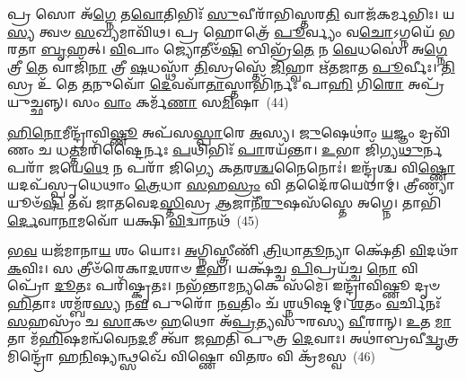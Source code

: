 {\anuvakamend[{\-\ul{𑌰}\-\-\ul{𑌕𑍍𑌷}\-\-\ul{𑌸𑍍𑌵} 𑌭𑍍𑌰𑌾𑌤𑍃᳴\-\ul{𑌵𑍍𑌯}\-𑌸𑍍𑌤𑍍𑌰𑌯𑍋᳴𑌦𑌶 𑌚}]}%

𑌪𑍍𑌰 𑌸𑍋 𑌅᳴\-\ul{𑌗𑍍𑌨𑍇} 𑌤\-\ul{𑌵𑍋}\-𑌤𑌿𑌭𑌿𑌃᳴ \ul{𑌸𑍁}\-𑌵𑍀𑌰𑌾᳴𑌭𑌿𑌸𑍍𑌤𑌰\-\ul{𑌤𑌿} 𑌵𑌾𑌜᳴𑌕𑌰𑍍𑌮𑌭𑌿𑌃। 𑌯\-\ul{𑌸𑍍𑌯} 𑌤𑍍𑌵𑍞 \ul{𑌸}\-𑌖𑍍𑌯𑌮𑌾𑌵𑌿᳴𑌥। 𑌪𑍍𑌰 𑌹𑍋𑌤𑍍𑌰𑍇᳴ \ul{𑌪𑍂}\-𑌰𑍍𑌵𑍍𑌯𑌂 𑌵\-\ul{𑌚𑍋}\-\-𑌽𑌗𑍍𑌨𑌯𑍇᳴ 𑌭𑌰𑌤𑌾 \ul{𑌬𑍃}\-𑌹𑌤𑍍। \ul{𑌵𑌿}\-𑌪𑌾𑌂 𑌜𑍍𑌯𑍋𑌤𑍀𑍞᳴\-\ul{𑌷𑌿} 𑌬𑌿𑌭𑍍𑌰᳴\-\ul{𑌤𑍇} 𑌨 \ul{𑌵𑍇}\-𑌧𑌸𑍇॑। 𑌅\-\ul{𑌗𑍍𑌨𑍇} 𑌤𑍍𑌰𑍀 \ul{𑌤𑍇} 𑌵𑌾𑌜𑌿᳴\-\ul{𑌨𑌾} 𑌤𑍍𑌰𑍀 \ul{𑌷}\-𑌧𑌸𑍍𑌥𑌾᳴ \ul{𑌤𑌿}\-𑌸𑍍𑌰𑌸𑍍𑌤𑍇᳴ \ul{𑌜𑌿}\-𑌹𑍍𑌵𑌾 𑌋᳴𑌤𑌜𑌾𑌤 \ul{𑌪𑍂}\-𑌰𑍍𑌵𑍀𑌃। \ul{𑌤𑌿}\-𑌸𑍍𑌰 𑌉᳴ 𑌤𑍇 \ul{𑌤}\-𑌨𑍁𑌵𑍋᳴ \ul{𑌦𑍇}\-𑌵𑌵𑌾᳴\-\ul{𑌤𑌾}\-𑌸𑍍𑌤𑌾𑌭𑌿᳴𑌰𑍍𑌨𑌃 𑌪𑌾\-\ul{𑌹𑌿} 𑌗𑌿\-\ul{𑌰𑍋} 𑌅𑌪𑍍𑌰᳴𑌯𑍁𑌚𑍍𑌛𑌨𑍍𑌨𑍍। 𑌸𑌂 \ul{𑌵𑌾𑌂} 𑌕𑌰𑍍𑌮᳴\-\ul{𑌣𑌾} 𑌸\-\ul{𑌮𑌿}\-𑌷𑌾~(44)

\-\ul{𑌹𑌿}\-\-\ul{𑌨𑍋}\-𑌮𑍀𑌨𑍍𑌦𑍍𑌰𑌾᳴𑌵𑌿\-\ul{𑌷𑍍𑌣𑍂} 𑌅𑌪᳴𑌸\-\ul{𑌸𑍍𑌪𑌾}\-𑌰𑍇 \ul{𑌅}\-𑌸𑍍𑌯। \ul{𑌜𑍁}\-𑌷𑍇𑌥𑌾𑌂॑ \ul{𑌯}\-𑌜𑍍𑌞𑌂 𑌦𑍍𑌰𑌵𑌿᳴𑌣𑌂 𑌚 𑌧\-\ul{𑌤𑍍𑌤}\-𑌮𑌰𑌿᳴𑌷𑍍𑌟𑍈𑌰𑍍𑌨𑌃 \ul{𑌪}\-𑌥𑌿𑌭𑌿𑌃᳴ \ul{𑌪𑌾}\-𑌰𑌯᳴𑌨𑍍𑌤𑌾। \ul{𑌉}\-𑌭𑌾 𑌜𑌿᳴𑌗𑍍𑌯\-\ul{𑌥𑍁}\-𑌰𑍍𑌨 𑌪𑌰𑌾᳴ 𑌜𑌯𑍇\-\ul{𑌥𑍇} 𑌨 𑌪𑌰𑌾᳴ 𑌜𑌿𑌗𑍍𑌯𑍇 𑌕\-\ul{𑌤}\-𑌰\-\ul{𑌶𑍍𑌚}\-𑌨𑍈𑌨𑍋𑌃॑। 𑌇𑌨𑍍𑌦𑍍𑌰᳴𑌶𑍍𑌚 𑌵𑌿\-\ul{𑌷𑍍𑌣𑍋} 𑌯𑌦𑌪᳴𑌸𑍍𑌪𑍃𑌧𑍇𑌥𑌾𑌂 \ul{𑌤𑍍𑌰𑍇}\-𑌧𑌾 \ul{𑌸}\-𑌹\-\ul{𑌸𑍍𑌰𑌂} 𑌵𑌿 𑌤𑌦𑍈᳴𑌰𑌯𑍇𑌥𑌾𑌮𑍍। 𑌤𑍍𑌰𑍀𑌣𑍍𑌯𑌾𑌯𑍂𑍞᳴\-\ul{𑌷𑌿} 𑌤𑌵᳴ 𑌜𑌾𑌤𑌵𑍇𑌦\-\ul{𑌸𑍍𑌤𑌿}\-𑌸𑍍𑌰 \ul{𑌆}\-𑌜𑌾𑌨𑍀᳴\-\ul{𑌰𑍁}\-𑌷𑌸᳴𑌸𑍍𑌤𑍇 𑌅𑌗𑍍𑌨𑍇। 𑌤𑌾𑌭𑌿᳴\-\ul{𑌰𑍍𑌦𑍇}\-𑌵𑌾\-\ul{𑌨𑌾}\-𑌮𑌵𑍋᳴ 𑌯𑌕𑍍𑌷𑌿 \ul{𑌵𑌿}\-𑌦𑍍𑌵𑌾𑌨𑌥᳴~(45)

\-\ul{𑌭}\-\-\ul{𑌵} 𑌯𑌜᳴𑌮𑌾𑌨𑌾\-\ul{𑌯} 𑌶𑌂 𑌯𑍋𑌃। \ul{𑌅}\-𑌗𑍍𑌨𑌿𑌸𑍍𑌤𑍍𑌰𑍀𑌣𑌿᳴ \ul{𑌤𑍍𑌰𑌿}\-𑌧𑌾\-\ul{𑌤𑍂}\-𑌨𑍍𑌯𑌾 𑌕𑍍𑌷𑍇᳴𑌤𑌿 \ul{𑌵𑌿}\-𑌦𑌥𑌾᳴ \ul{𑌕}\-𑌵𑌿𑌃। 𑌸 𑌤𑍍𑌰𑍀𑍞᳴𑌰𑍇𑌕𑌾\-\ul{𑌦}\-𑌶𑌾𑍞 \ul{𑌇}\-𑌹। 𑌯𑌕𑍍𑌷᳴𑌚𑍍𑌚 \ul{𑌪𑌿}\-𑌪𑍍𑌰𑌯᳴𑌚𑍍𑌚 \ul{𑌨𑍋} 𑌵𑌿𑌪𑍍𑌰𑍋᳴ \ul{𑌦𑍂}\-𑌤𑌃 𑌪𑌰𑌿᳴𑌷𑍍𑌕𑍃𑌤𑌃। 𑌨𑌭᳴𑌨𑍍𑌤𑌾𑌮\-\ul{𑌨𑍍𑌯}\-𑌕𑍇 𑌸᳴𑌮𑍇। 𑌇𑌨𑍍𑌦𑍍𑌰𑌾᳴𑌵𑌿𑌷𑍍𑌣𑍂 𑌦𑍃𑍞\-\ul{𑌹𑌿}\-𑌤𑌾𑌃 𑌶𑌮𑍍𑌬᳴𑌰\-\ul{𑌸𑍍𑌯} 𑌨\-\ul{𑌵} 𑌪𑍁𑌰𑍋᳴ 𑌨\-\ul{𑌵}\-𑌤𑌿𑌂 𑌚᳴ 𑌶𑍍𑌨𑌥𑌿𑌷𑍍𑌟𑌮𑍍। \ul{𑌶}\-𑌤𑌂 \ul{𑌵}\-𑌰𑍍𑌚𑌿𑌨𑌃᳴ \ul{𑌸}\-𑌹𑌸𑍍𑌰𑌂᳴ 𑌚 \ul{𑌸𑌾}\-𑌕𑍞 \ul{𑌹}\-𑌥𑍋 𑌅᳴\-\ul{𑌪𑍍𑌰}\-𑌤𑍍𑌯𑌸𑍁᳴𑌰𑌸𑍍𑌯 \ul{𑌵𑍀}\-𑌰𑌾𑌨𑍍। \ul{𑌉}\-𑌤 \ul{𑌮𑌾}\-𑌤𑌾 𑌮᳴\-\ul{𑌹𑌿}\-𑌷𑌮𑌨𑍍𑌵᳴𑌵𑍇𑌨\-\ul{𑌦}\-𑌮𑍀 𑌤𑍍𑌵𑌾᳴ 𑌜𑌹𑌤𑌿 𑌪𑍁𑌤𑍍𑌰 \ul{𑌦𑍇}\-𑌵𑌾𑌃। 𑌅𑌥𑌾॑𑌬𑍍𑌰𑌵𑍀\-\ul{𑌦𑍍𑌵𑍃}\-𑌤𑍍𑌰𑌮𑌿𑌨𑍍𑌦𑍍𑌰𑍋᳴ 𑌹\-\ul{𑌨𑌿}\-𑌷𑍍𑌯𑌨𑍍𑌥𑍍𑌸𑌖𑍇᳴ 𑌵𑌿𑌷𑍍𑌣𑍋 𑌵𑌿\-\ul{𑌤}\-𑌰𑌂 𑌵𑌿 𑌕𑍍𑌰᳴𑌮𑌸𑍍𑌵~(46)


{\anuvakamend[{\-\ul{𑌇}\-𑌷𑌾\-𑌽𑌥᳴ \ul{𑌤𑍍𑌵𑌾} 𑌤𑍍𑌰𑌯𑍋᳴𑌦𑌶 𑌚}]}%

\prashnaend[{𑌯𑍋 𑌵𑍈 𑌸𑍍𑌫𑍍𑌯𑌃 \ul{𑌸𑍍𑌵}\-𑌸𑍍𑌤𑌿𑌃 \ul{𑌸𑍍𑌵}\-𑌧𑌾\-\ul{𑌯𑍈} 𑌨\-\ul{𑌮𑌃} 𑌪𑍍𑌰 𑌮𑍁़᳴\-\ul{𑌞𑍍𑌚} 𑌤𑌿𑌷𑍍𑌠᳴𑌤𑍀\-\ul{𑌵} 𑌷𑌟𑍍𑌚᳴𑌤𑍍𑌵𑌾𑌰𑌿𑍞𑌶𑌤𑍍॥46॥ 𑌯𑍋 𑌵𑍈 𑌪𑌵᳴𑌮𑌾𑌨𑌾\-\ul{𑌨𑌾𑌂} 𑌵𑌿 𑌕𑍍𑌰᳴𑌮𑌸𑍍𑌵॥}]
